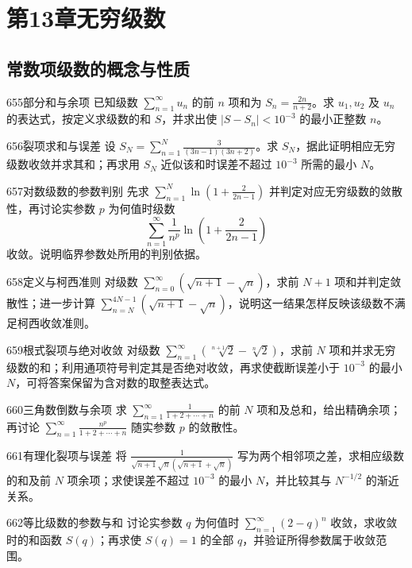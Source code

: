 \section{第13章\quad 无穷级数}
\subsection{常数项级数的概念与性质}
\begin{exercise}{655}{部分和与余项}
已知级数 $\sum_{n=1}^{\infty}u_n$ 的前 $n$ 项和为 $S_n=\frac{2n}{n+2}$。求 $u_1,u_2$ 及 $u_n$ 的表达式，按定义求级数的和 $S$，并求出使 $|S-S_n|<10^{-3}$ 的最小正整数 $n$。
\end{exercise}
\begin{exercise}{656}{裂项求和与误差}
设 $S_N=\sum_{n=1}^{N}\frac{3}{(3n-1)(3n+2)}$。求 $S_N$，据此证明相应无穷级数收敛并求其和；再求用 $S_N$ 近似该和时误差不超过 $10^{-3}$ 所需的最小 $N$。
\end{exercise}
\begin{exercise}{657}{对数级数的参数判别}
先求 $\sum_{n=1}^{N}\ln\left(1+\frac{2}{2n-1}\right)$ 并判定对应无穷级数的敛散性，再讨论实参数 $p$ 为何值时级数
\[\sum_{n=1}^{\infty}\frac{1}{n^p}\ln\left(1+\frac{2}{2n-1}\right)\]
收敛。说明临界参数处所用的判别依据。
\end{exercise}
\begin{exercise}{658}{定义与柯西准则}
对级数 $\sum_{n=0}^{\infty}(\sqrt{n+1}-\sqrt n)$，求前 $N+1$ 项和并判定敛散性；进一步计算 $\sum_{n=N}^{4N-1}(\sqrt{n+1}-\sqrt n)$，说明这一结果怎样反映该级数不满足柯西收敛准则。
\end{exercise}
\begin{exercise}{659}{根式裂项与绝对收敛}
对级数 $\sum_{n=1}^{\infty}(\sqrt[n+1]{2}-\sqrt[n]{2})$，求前 $N$ 项和并求无穷级数的和；利用通项符号判定其是否绝对收敛，再求使截断误差小于 $10^{-3}$ 的最小 $N$，可将答案保留为含对数的取整表达式。
\end{exercise}
\begin{exercise}{660}{三角数倒数与余项}
求 $\sum_{n=1}^{\infty}\frac1{1+2+\cdots+n}$ 的前 $N$ 项和及总和，给出精确余项；再讨论 $\sum_{n=1}^{\infty}\frac{n^p}{1+2+\cdots+n}$ 随实参数 $p$ 的敛散性。
\end{exercise}
\begin{exercise}{661}{有理化裂项与误差}
将 $\frac1{\sqrt{n+1}\sqrt n(\sqrt{n+1}+\sqrt n)}$ 写为两个相邻项之差，求相应级数的和及前 $N$ 项余项；求使误差不超过 $10^{-3}$ 的最小 $N$，并比较其与 $N^{-1/2}$ 的渐近关系。
\end{exercise}
\begin{exercise}{662}{等比级数的参数与和}
讨论实参数 $q$ 为何值时 $\sum_{n=1}^{\infty}(2-q)^n$ 收敛，求收敛时的和函数 $S(q)$；再求使 $S(q)=1$ 的全部 $q$，并验证所得参数属于收敛范围。
\end{exercise}
